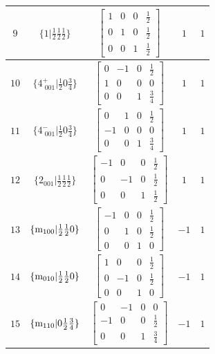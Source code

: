 \documentclass[fleqn,8pt]{jsarticle}
\begin{document}
\begin{longtable}{ccccc}
$ 9 $ & $ \{1|\frac{1}{2} \frac{1}{2} \frac{1}{2}\} $ & $ \begin{bmatrix} 1 & 0 & 0 & \frac{1}{2} \\ 0 & 1 & 0 & \frac{1}{2} \\ 0 & 0 & 1 & \frac{1}{2} \end{bmatrix} $ & $ 1 $ & $ 1 $ \\ \hline
$ 10 $ & $ \{4^{+}_{\,\,001}|\frac{1}{2} 0 \frac{3}{4}\} $ & $ \begin{bmatrix} 0 & -1 & 0 & \frac{1}{2} \\ 1 & 0 & 0 & 0 \\ 0 & 0 & 1 & \frac{3}{4} \end{bmatrix} $ & $ 1 $ & $ 1 $ \\ \hline
$ 11 $ & $ \{4^{-}_{\,\,001}|\frac{1}{2} 0 \frac{3}{4}\} $ & $ \begin{bmatrix} 0 & 1 & 0 & \frac{1}{2} \\ -1 & 0 & 0 & 0 \\ 0 & 0 & 1 & \frac{3}{4} \end{bmatrix} $ & $ 1 $ & $ 1 $ \\ \hline
$ 12 $ & $ \{2{}_{001}|\frac{1}{2} \frac{1}{2} \frac{1}{2}\} $ & $ \begin{bmatrix} -1 & 0 & 0 & \frac{1}{2} \\ 0 & -1 & 0 & \frac{1}{2} \\ 0 & 0 & 1 & \frac{1}{2} \end{bmatrix} $ & $ 1 $ & $ 1 $ \\ \hline
$ 13 $ & $ \{{\rm m}_{100}|\frac{1}{2} \frac{1}{2} 0\} $ & $ \begin{bmatrix} -1 & 0 & 0 & \frac{1}{2} \\ 0 & 1 & 0 & \frac{1}{2} \\ 0 & 0 & 1 & 0 \end{bmatrix} $ & $ -1 $ & $ 1 $ \\ \hline
$ 14 $ & $ \{{\rm m}_{010}|\frac{1}{2} \frac{1}{2} 0\} $ & $ \begin{bmatrix} 1 & 0 & 0 & \frac{1}{2} \\ 0 & -1 & 0 & \frac{1}{2} \\ 0 & 0 & 1 & 0 \end{bmatrix} $ & $ -1 $ & $ 1 $ \\ \hline
$ 15 $ & $ \{{\rm m}_{110}|0 \frac{1}{2} \frac{3}{4}\} $ & $ \begin{bmatrix} 0 & -1 & 0 & 0 \\ -1 & 0 & 0 & \frac{1}{2} \\ 0 & 0 & 1 & \frac{3}{4} \end{bmatrix} $ & $ -1 $ & $ 1 $ \\ \hline

\end{longtable}
\end{document}
